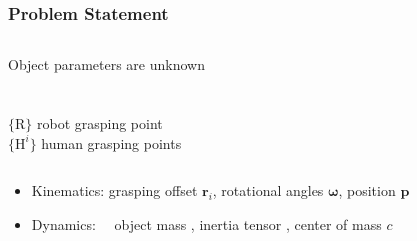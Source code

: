 \documentclass[student,noshadow]{ITRslides}
\renewcommand{\vec}[1]{\boldsymbol{#1}}
\renewcommand{\vec}[1]{\boldsymbol{#1}}
\begin{document}
\begin{frame}
	\frametitle{Problem Statement}

	\begin{columns}
	Object parameters are unknown\\
	~ \\ ~ \\
	$\{\mathrm{R}\}$ robot grasping point \\
	$\{\mathrm{H}^i\}$ human grasping points \\
	\end{columns}	
	
		\centering

			\begin{figure}
				\centering
				
			\end{figure}
	\begin{small}
		\begin{itemize}
 		\item Kinematics: grasping offset $\vec{r}_i$, rotational angles $\vec{\omega}$, position $\vec{p}$
 		\item Dynamics: \ \ object mass \color{red}{$m$}, \color{black} inertia tensor \color{red}{$\vec{I}$}\color{black}, center of mass \color{red}$c$
	\end{itemize}
	\end{small}
\end{frame}
\end{document}
